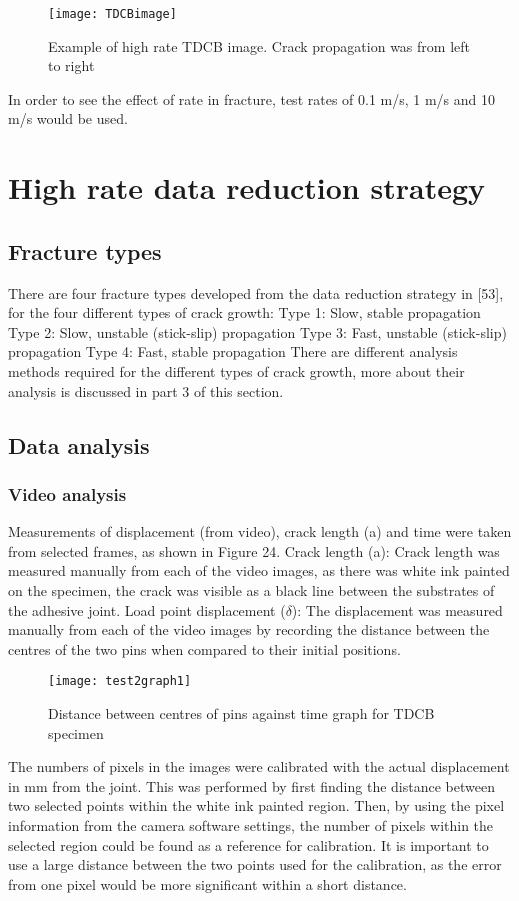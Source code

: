 \documentclass[numbers=noendperiod,chapterprefix=on]{icldt} %
\begin{document}
\begin{figure}[!htpb]
\centering
\texttt{[image: TDCBimage]}
\caption{Example of high rate TDCB image. Crack propagation was from left to right} %
\end{figure}
\FloatBarrier
In order to see the effect of rate in fracture, test rates of 0.1 m/s, 1 m/s and 10 m/s would be used.

\section{High rate data reduction strategy}
\subsection{Fracture types}
There are four fracture types developed from the data reduction strategy in [53], for the four different types of crack growth:
\newline
Type 1: Slow, stable propagation
\newline
Type 2: Slow, unstable (stick-slip) propagation
\newline
Type 3: Fast, unstable (stick-slip) propagation
\newline
Type 4: Fast, stable propagation
\newline
There are different analysis methods required for the different types of crack growth, more about their analysis is discussed in part 3 of this section. 

\subsection{Data analysis}
\subsubsection{Video analysis}
Measurements of displacement (from video), crack length (a) and time were taken from selected frames, as shown in Figure 24. 
Crack length (a): Crack length was measured manually from each of the video images, as there was white ink painted on the specimen, the crack was visible as a black line between the substrates of the adhesive joint.
Load point displacement ($\delta$): The displacement was measured manually from each of the video images by recording the distance between the centres of the two pins when compared to their initial positions.

\begin{figure}[!htpb]
\centering
\texttt{[image: test2graph1]}
\caption{Distance between centres of pins against time graph for TDCB specimen } %
\end{figure}
\FloatBarrier
The numbers of pixels in the images were calibrated with the actual displacement in mm from the joint. This was performed by first finding the distance between two selected points within the white ink painted region. Then, by using the pixel information from the camera software settings, the number of pixels within the selected region could be found as a reference for calibration. It is important to use a large distance between the two points used for the calibration, as the error from one pixel would be more significant within a short distance. 
\end{document}
